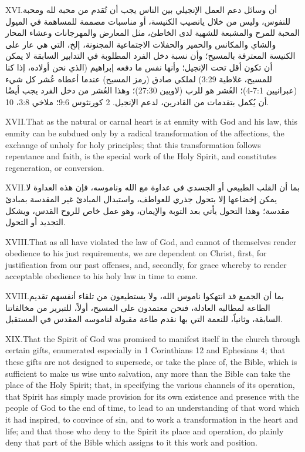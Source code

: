 \lettrine{XVI.} أن وسائل دعم العمل الإنجيلي بين الناس يجب أن تُقدم من محبة لله ومحبة للنفوس، وليس من خلال يانصيب الكنيسة، أو مناسبات مصممة للمساهمة في الميول المحبة للمرح والمشبعة للشهية لدى الخاطئ، مثل المعارض والمهرجانات وعشاء المحار والشاي والمكانس والحمير والحفلات الاجتماعية المجنونة، إلخ، التي هي عار على الكنيسة المعترفة بالمسيح؛ وأن نسبة دخل الفرد المطلوبة في التدابير السابقة لا يمكن أن تكون أقل تحت الإنجيل؛ وأنها نفس ما دفعه إبراهيم (الذي نحن أولاده، إذا كنا للمسيح، غلاطية 3:29) لملكي صادق (رمز المسيح) عندما أعطاه عُشر كل شيء (عبرانيين 7:1-4)؛ العُشر هو للرب (لاويين 27:30)؛ وهذا العُشر من دخل الفرد يجب أيضًا أن يُكمل بتقدمات من القادرين، لدعم الإنجيل. 2 كورنثوس 9:6؛ ملاخي 3:8، 10.


\lettrine{XVII.} That as the natural or carnal heart is at enmity with God and his law, this enmity can be subdued only by a radical transformation of the affections, the exchange of unholy for holy principles; that this transformation follows repentance and faith, is the special work of the Holy Spirit, and constitutes regeneration, or conversion.


\lettrine{XVII.} بما أن القلب الطبيعي أو الجسدي في عداوة مع الله وناموسه، فإن هذه العداوة لا يمكن إخضاعها إلا بتحول جذري للعواطف، واستبدال المبادئ غير المقدسة بمبادئ مقدسة؛ وهذا التحول يأتي بعد التوبة والإيمان، وهو عمل خاص للروح القدس، ويشكل التجديد أو التحول.


\lettrine{XVIII.} That as all have violated the law of God, and cannot of themselves render obedience to his just requirements, we are dependent on Christ, first, for justification from our past offenses, and, secondly, for grace whereby to render acceptable obedience to his holy law in time to come.


\lettrine{XVIII.} بما أن الجميع قد انتهكوا ناموس الله، ولا يستطيعون من تلقاء أنفسهم تقديم الطاعة لمطالبه العادلة، فنحن معتمدون على المسيح، أولاً، للتبرير من مخالفاتنا السابقة، وثانياً، للنعمة التي بها نقدم طاعة مقبولة لناموسه المقدس في المستقبل.


\lettrine{XIX.} That the Spirit of God was promised to manifest itself in the church through certain gifts, enumerated especially in 1 Corinthians 12 and Ephesians 4; that these gifts are not designed to supersede, or take the place of, the Bible, which is sufficient to make us wise unto salvation, any more than the Bible can take the place of the Holy Spirit; that, in specifying the various channels of its operation, that Spirit has simply made provision for its own existence and presence with the people of God to the end of time, to lead to an understanding of that word which it had inspired, to convince of sin, and to work a transformation in the heart and life; and that those who deny to the Spirit its place and operation, do plainly deny that part of the Bible which assigns to it this work and position.


